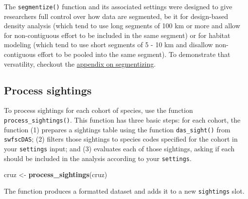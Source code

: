 \documentclass[
]{book}
\newenvironment{Shaded}{\begin{snugshade}}{\end{snugshade}}
\newcommand{\DecValTok}[1]{\textcolor[rgb]{0.00,0.00,0.81}{#1}}
\newcommand{\FunctionTok}[1]{\textcolor[rgb]{0.13,0.29,0.53}{\textbf{#1}}}
\newcommand{\NormalTok}[1]{#1}
\newcommand{\OtherTok}[1]{\textcolor[rgb]{0.56,0.35,0.01}{#1}}
\newcommand{\SpecialCharTok}[1]{\textcolor[rgb]{0.81,0.36,0.00}{\textbf{#1}}}
\newcommand{\StringTok}[1]{\textcolor[rgb]{0.31,0.60,0.02}{#1}}
\begin{document}
The \texttt{segmentize()} function and its associated settings were designed to give researchers full control over how data are segmented, be it for design-based density analysis (which tend to use long segments of 100 km or more and allow for non-contiguous effort to be included in the same segment) or for habitat modeling (which tend to use short segments of 5 - 10 km and disallow non-contiguous effort to be pooled into the same segment). To demonstrate that versatility, checkout the \protect\hyperlink{segmentizing}{appendix on segmentizing}.

\hypertarget{process-sightings}{%
\subsection*{Process sightings}\label{process-sightings}}

To process sightings for each cohort of species, use the function \texttt{process\_sightings()}. This function has three basic steps: for each cohort, the function (1) prepares a sightings table using the function \texttt{das\_sight()} from \texttt{swfscDAS}; (2) filters those sightings to species codes specified for the cohort in your \texttt{settings} input; and (3) evaluates each of those sightings, asking if each should be included in the analysis according to your \texttt{settings}.

\begin{Shaded}
\begin{Highlighting}[]
\NormalTok{cruz }\OtherTok{\textless{}{-}} \FunctionTok{process\_sightings}\NormalTok{(cruz)}
\end{Highlighting}
\end{Shaded}

The function produces a formatted dataset and adds it to a new \texttt{sightings} slot.

\begin{Shaded}
\end{Shaded}
\end{document}
